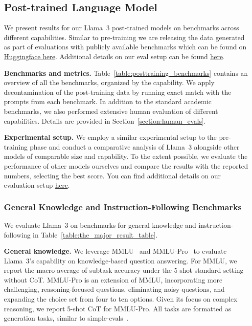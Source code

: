 \subsection{Post-trained Language Model}
\label{section:results_finetuned}

We present results for our Llama~3 post-trained models on benchmarks across different capabilities. Similar to pre-training we are releasing the data generated as part of evaluations with publicly available benchmarks which can be found on \href{https://huggingface.co/meta-llama}{Huggingface here}. Additional details on our eval setup can be found \href{https://github.com/meta-llama/llama-models/blob/main/models/llama3_1/eval_details.md}{here}.

\textbf{Benchmarks and metrics.} Table~\ref{table:posttraining_benchmarks} contains an overview of all the benchmarks, organized by the capability. We apply decontamination of the post-training data by running exact match with the prompts from each benchmark. In addition to the standard academic benchmarks, we also performed extensive human evaluation of different capabilities. Details are provided in Section~\ref{section:human_evals}.

\textbf{Experimental setup.} We employ a similar experimental setup to the pre-training phase and conduct a comparative analysis of Llama~3 alongside other models of comparable size and capability. To the extent possible, we evaluate the performance of other models ourselves and compare the results with the reported numbers, selecting the best score. You can find additional details on our evaluation setup \href{https://github.com/meta-llama/llama-models/blob/main/models/llama3_1/eval_details.md}{here}.

\subsubsection{General Knowledge and Instruction-Following Benchmarks} We evaluate Llama~3 on benchmarks for general knowledge and instruction-following in Table~\ref{table:the_major_result_table}.

\textbf{General knowledge.} We leverage MMLU~\citep{hendrycks2021mmlu} and MMLU-Pro~\citep{wang2024mmlu} to evaluate Llama~3's capability on knowledge-based question answering. For MMLU, we report the macro average of subtask accuracy under the 5-shot standard setting without CoT. MMLU-Pro is an extension of MMLU, incorporating more challenging, reasoning-focused questions, eliminating noisy questions, and expanding the choice set from four to ten options. Given its focus on complex reasoning, we report 5-shot CoT for MMLU-Pro. All tasks are formatted as generation tasks, similar to simple-evals~\citep{simpleevals}.

